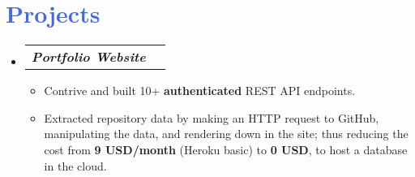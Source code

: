 \documentclass[letterpaper,11pt]{article}
\makeatletter
\newcommand{\myuline}[1]{%
  \uline{\phantom{#1}}%
  \llap{\contour{white}{#1}}%
}
\newcommand{\resumeItem}[1]{
  \item\small{
    {#1 \vspace{-1pt}}
  }
}
\newcommand{\resumeProjectHeading}[2]{
    \item
    \begin{tabular*}{\textwidth}{l@{\extracolsep{\fill}}r}
      \textit{\small #1} & \textit{\small #2} \\
    \end{tabular*}\vspace{-5pt}
}
\newcommand{\resumeSubHeadingListStart}{\begin{itemize}[leftmargin=0in, label={}]}
\newcommand{\resumeSubHeadingListEnd}{\end{itemize}}
\newcommand{\resumeItemListStart}{\begin{itemize}}
\newcommand{\resumeItemListEnd}{\end{itemize}\vspace{0pt}}
\makeatother
\begin{document}
\section{\textcolor{RoyalBlue}{Projects}}
    \resumeSubHeadingListStart
      \resumeProjectHeading
          {\textbf{Portfolio Website}} {\myuline{\href{https://akashverma.vercel.app}{Visit site}}}
          \resumeItemListStart
            \resumeItem{Contrive and built 10+ \textbf{authenticated} REST API endpoints.}
            \resumeItem{Extracted repository data by making an HTTP request to GitHub, manipulating the data, and rendering down in the site; thus reducing the cost from \textbf{9 USD/month} (Heroku basic) to \textbf{0 USD}, to host a database in the cloud.}
          \resumeItemListEnd

    \resumeSubHeadingListEnd
\end{document}
